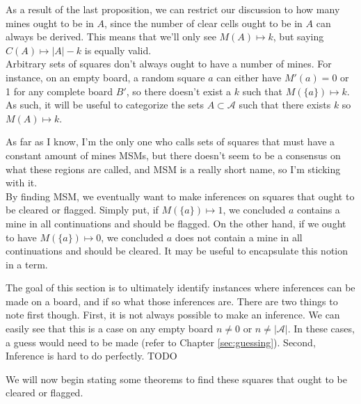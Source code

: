 As a result of the last proposition, we can restrict our discussion to how many mines ought to be in $A$, since the number of clear cells ought to be in $A$ can always be derived. This means that we'll only see $M(A)\mapsto k$, but saying $C(A)\mapsto |A|-k$ is equally valid.\\

Arbitrary sets of squares don't always ought to have a number of mines. For instance, on an empty board, a random square $a$ can either have $M'(a)=0$ or 1 for any complete board $B'$, so there doesn't exist a $k$ such that $M(\{a\})\mapsto k$. As such, it will be useful to categorize the sets $A\subset\mathcal{A}$ such that there exists $k$ so $M(A)\mapsto k$.


As far as I know, I'm the only one who calls sets of squares that must have a constant amount of mines MSMs, but there doesn't seem to be a consensus on what these regions are called, and MSM is a really short name, so I'm sticking with it.\\

By finding MSM, we eventually want to make inferences on squares that ought to be cleared or flagged. Simply put, if $M(\{a\})\mapsto1$, we concluded $a$ contains a mine in all continuations and should be flagged. On the other hand, if we ought to have $M(\{a\})\mapsto0$, we concluded $a$ does not contain a mine in all continuations and should be cleared. It may be useful to encapsulate this notion in a term.\\


The goal of this section is to ultimately identify instances where inferences can be made on a board, and if so what those inferences are. There are two things to note first though. First, it is not always possible to make an inference. We can easily see that this is a case on any empty board $n\neq0$ or $n\neq|\mathcal{A}|$. In these cases, a guess would need to be made (refer to Chapter \ref{sec:guessing}). Second, Inference is hard to do perfectly.  TODO

We will now begin stating some theorems to find these squares that ought to be cleared or flagged.\\

